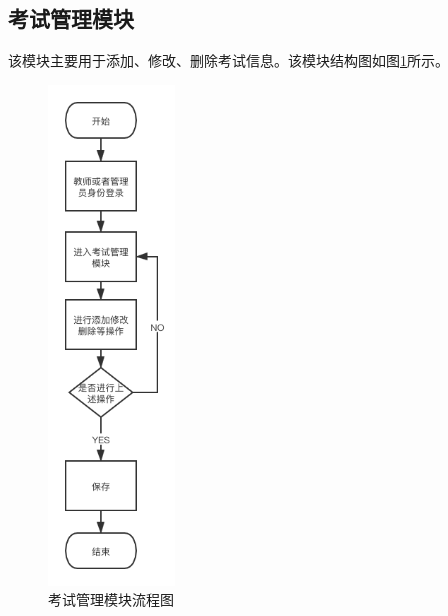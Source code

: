 \subsection{考试管理模块}
该模块主要用于添加、修改、删除考试信息。该模块结构图如图\ref{figure:examManage}所示。
\begin{figure}[H]
\centering
\includegraphics[width=0.3\textwidth,keepaspectratio]{data/chapter-5/examManage.png}
\caption{考试管理模块流程图}
\label{figure:examManage}
\end{figure}
